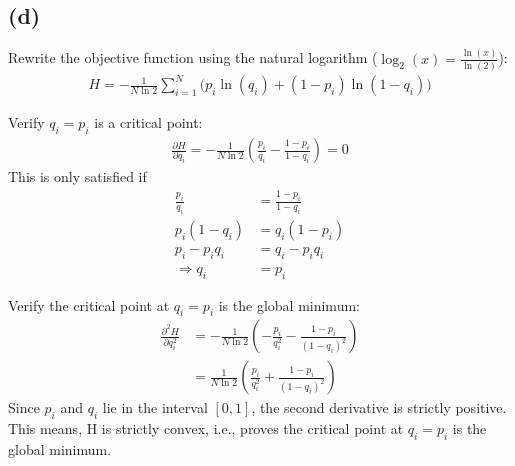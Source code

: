 \documentclass{article}
\begin{document}
    \subsection*{(d)}
    Rewrite the objective function using the natural logarithm ($\log_2(x) = \frac{\ln(x)}{\ln(2)}$):
    \begin{align}
        H = -\frac{1}{N \ln 2} \sum_{i=1}^N \Big( p_i \ln(q_i) + (1 - p_i) \ln(1 - q_i) \Big)
    \end{align}

    Verify $q_i = p_i$ is a critical point:
    \begin{align}
        \frac{\partial H}{\partial q_i} = -\frac{1}{N \ln 2} \left( \frac{p_i}{q_i} - \frac{1 - p_i}{1 - q_i} \right) = 0
    \end{align}
    This is only satisfied if 
    \begin{align}
        \frac{p_i}{q_i}&=\frac{1-p_i}{1-q_i}\\[0.2cm]
        p_i(1 - q_i) &= q_i(1 - p_i)\\[0.2cm]
        p_i - p_i q_i &= q_i - p_i q_i\\[0.2cm]
       \Rightarrow q_i &= p_i
    \end{align}

    Verify the critical point at $q_i = p_i$ is the global minimum:
    \begin{align}
        \frac{\partial^2 H}{\partial q_i^2} 
        &= -\frac{1}{N \ln 2} \left( -\frac{p_i}{q_i^2} - \frac{1 - p_i}{(1 - q_i)^2} \right)\\
        &= \frac{1}{N \ln 2} \left( \frac{p_i}{q_i^2} + \frac{1 - p_i}{(1 - q_i)^2} \right)
    \end{align}
    Since $p_i$ and $q_i$ lie in the interval $[0,1]$, the second derivative is strictly positive. This means, H is strictly convex, i.e., proves the critical point at $q_i = p_i$ is the global minimum.
    
\end{document}
